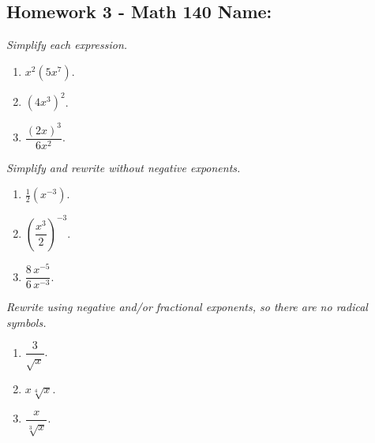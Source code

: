 \documentclass[10pt]{article}
\begin{document}
\pagestyle{empty}
\subsection*{Homework 3 - Math 140 \hfill Name: \underline{\hspace*{2in}}}


\noindent 
\textit{Simplify each expression.}
\begin{multicols}{3}
\begin{enumerate}
\setcounter{enumi}{\theenumCount}
\item $x^2 (5x^7)$.
\item $(4x^3)^2$.
\item $\dfrac{(2x)^3}{6 x^2}$.
\setcounter{enumCount}{\theenumi}
\end{enumerate}
\end{multicols}
\vfill

\noindent
\textit{Simplify and rewrite without negative exponents.}
\begin{multicols}{3}
\begin{enumerate}
\setcounter{enumi}{\theenumCount}
\item $\frac{1}{2} (x^{-3})$.
\item $\left(\dfrac{x^3}{2}\right)^{-3}$.
\item $\dfrac{8 \, x^{-5}}{6 \, x^{-3}}$.
\setcounter{enumCount}{\theenumi}
\end{enumerate}
\end{multicols}
\vfill

\noindent 
\textit{Rewrite using negative and/or fractional exponents, so there are no radical symbols.}
\begin{multicols}{3}
\begin{enumerate}
\setcounter{enumi}{\theenumCount}
\item $\dfrac{3}{\sqrt{x}}$.
\item $x \sqrt[4]{x}$.
\item $\dfrac{x}{\sqrt[3]{x}}$.
\setcounter{enumCount}{\theenumi}
\end{enumerate}
\end{multicols}
\vfill



\newpage
\end{document}
